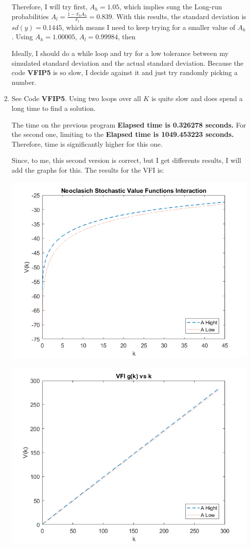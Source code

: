 \documentclass[12pt]{article}%
\begin{document}
\begin{enumerate}
	 Therefore, I will try first, $A_h=1.05$, which implies sung the Long-run probabilities $A_l=\frac{1-\bar{\pi_h}A_h}{\bar{\pi_l}}= 0.839$. With this results, the standard deviation is $sd(y)=0.1445$, which means I need to keep trying for a smaller value of $A_h$. Using $A_h=1.00005$, $A_l= 0.99984$, then 
	 
	 
	 Ideally, I should do a while loop and try for a low tolerance between my simulated standard deviation and the actual standard deviation. Because the code \textbf{VFIP5} is so slow, I decide against it and just try randomly picking a number.	 	 
	 
	
	\item See Code \textbf{VFIP5}. Using two loops over all $K$ is quite slow and does spend a long time to find a solution. 
	
	The time on the previous program \textbf{Elapsed time is 0.326278 seconds.}
	For the second one, limiting to the  \textbf{Elapsed time is 1049.453223 seconds.} Therefore, time is significantly higher for this one. 
	
	Since, to me, this second version is correct, but I get differents results, I will add the graphs for this. The results for the VFI is: 
	
	\begin{center}
		\includegraphics[width=1\linewidth]{VFP5}
	\end{center}
	
	\begin{center}
		\includegraphics[width=0.7\linewidth]{g_kP5}
	\end{center}


\end{enumerate}
\end{document}
